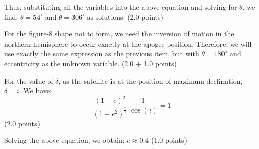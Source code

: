 \begin{description}
  Thus, substituting all the variables into the above equation and solving for
  $\theta$, we find: $\boxed{\theta = 54^\circ}$ and
  $\boxed{\theta = 306^\circ}$ as solutions. \hfill(2.0 points)

\item[(j)] For the figure-8 shape not to form, we need the inversion of motion
  in the northern hemisphere to occur exactly at the apogee position.
  Therefore, we will use exactly the same expression as the previous item, but
  with $\theta = 180^\circ$ and eccentricity as the unknown variable.
  \hfill(2.0 + 1.0 points)

  For the value of $\delta$, as the satellite is at the position of maximum
  declination, $\delta = i$. We have:
  \[
    \frac{(1 - e)^2}{(1 - e^2)^{\frac{3}{2}}}\,\frac{1}{\cos(i)} = 1
  \]
  \hfill(2.0 points)

  Solving the above equation, we obtain: $\boxed{e \approx 0.4}$
  \hfill(1.0 points)
\end{description}

